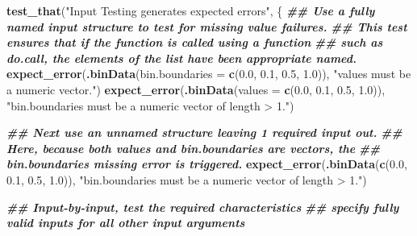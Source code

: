 \documentclass[
]{book}
\newenvironment{Shaded}{\begin{snugshade}}{\end{snugshade}}
\newcommand{\AttributeTok}[1]{\textcolor[rgb]{0.13,0.29,0.53}{#1}}
\newcommand{\DocumentationTok}[1]{\textcolor[rgb]{0.56,0.35,0.01}{\textbf{\textit{#1}}}}
\newcommand{\FloatTok}[1]{\textcolor[rgb]{0.00,0.00,0.81}{#1}}
\newcommand{\FunctionTok}[1]{\textcolor[rgb]{0.13,0.29,0.53}{\textbf{#1}}}
\newcommand{\NormalTok}[1]{#1}
\newcommand{\StringTok}[1]{\textcolor[rgb]{0.31,0.60,0.02}{#1}}
\begin{document}
\begin{Shaded}
\begin{Highlighting}[]
\FunctionTok{test\_that}\NormalTok{(}\StringTok{"Input Testing generates expected errors"}\NormalTok{, \{}
  \DocumentationTok{\#\# Use a fully named input structure to test for missing value failures.}
  \DocumentationTok{\#\#   This test ensures that if the function is called using a function}
  \DocumentationTok{\#\#   such as do.call, the elements of the list have been appropriate named.}
  \FunctionTok{expect\_error}\NormalTok{(}\FunctionTok{.binData}\NormalTok{(}\AttributeTok{bin.boundaries =} \FunctionTok{c}\NormalTok{(}\FloatTok{0.0}\NormalTok{, }\FloatTok{0.1}\NormalTok{, }\FloatTok{0.5}\NormalTok{, }\FloatTok{1.0}\NormalTok{)),}
               \StringTok{"\textasciigrave{}values\textasciigrave{} must be a numeric vector."}\NormalTok{)}
  \FunctionTok{expect\_error}\NormalTok{(}\FunctionTok{.binData}\NormalTok{(}\AttributeTok{values =} \FunctionTok{c}\NormalTok{(}\FloatTok{0.0}\NormalTok{, }\FloatTok{0.1}\NormalTok{, }\FloatTok{0.5}\NormalTok{, }\FloatTok{1.0}\NormalTok{)),}
               \StringTok{"\textasciigrave{}bin.boundaries\textasciigrave{} must be a numeric vector of length \textgreater{} 1."}\NormalTok{)}
  
  \DocumentationTok{\#\# Next use an unnamed structure leaving 1 required input out.}
  \DocumentationTok{\#\# Here, because both \textasciigrave{}values\textasciigrave{} and \textasciigrave{}bin.boundaries\textasciigrave{} are vectors, the}
  \DocumentationTok{\#\# \textasciigrave{}bin.boundaries\textasciigrave{} missing error is triggered.}
  \FunctionTok{expect\_error}\NormalTok{(}\FunctionTok{.binData}\NormalTok{(}\FunctionTok{c}\NormalTok{(}\FloatTok{0.0}\NormalTok{, }\FloatTok{0.1}\NormalTok{, }\FloatTok{0.5}\NormalTok{, }\FloatTok{1.0}\NormalTok{)),}
               \StringTok{"\textasciigrave{}bin.boundaries\textasciigrave{} must be a numeric vector of length \textgreater{} 1."}\NormalTok{)}
  
  \DocumentationTok{\#\# Input{-}by{-}input, test the required characteristics}
  \DocumentationTok{\#\# specify fully valid inputs for all other input arguments}
  

\end{Highlighting}
\end{Shaded}
\end{document}
